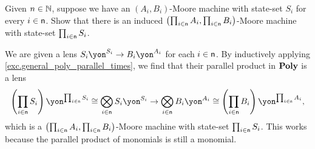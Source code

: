 \documentclass[Book-Poly]{subfiles}
\begin{document}
\begin{exercise}
Given $n\in\mathbb{N}$, suppose we have an $(A_i,B_i)$-Moore machine with state-set $S_i$ for every $i \in \mathsf{n}$.
Show that there is an induced $\left(\prod_{i \in \mathsf{n}} A_i, \prod_{i \in \mathsf{n}} B_i\right)$-Moore machine with state-set $\prod_{i \in \mathsf{n}} S_i$.
\begin{solution}
We are given a lens $S_i\yon^{S_i}\to B_i\yon^{A_i}$ for each $i\in\mathsf{n}$.
By inductively applying \cref{exc.general_poly_parallel_times}, we find that their parallel product in $\mathbf{Poly}$ is a lens
\[
  \left(\prod_{i\in\ord{n}}S_i\right)\yon^{\prod_{i\in\ord{n}}S_i}\iso\bigotimes_{i\in\ord{n}}S_i\yon^{S_i}\to\bigotimes_{i\in\ord{n}}B_i\yon^{A_i}\iso\left(\prod_{i\in\ord{n}}B_i\right)\yon^{\prod_{i\in\ord{n}}A_i},
\]
which is a $\left(\prod_{i \in \mathsf{n}} A_i, \prod_{i \in \mathsf{n}} B_i\right)$-Moore machine with state-set $\prod_{i\in\mathsf{n}}S_i$.
This works because the parallel product of monomials is still a monomial.
\end{solution}
\end{exercise}
\end{document}
